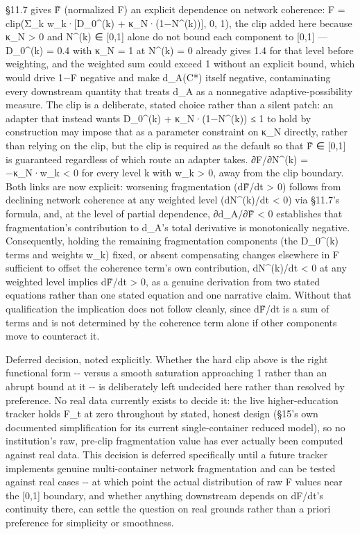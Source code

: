 \documentclass[
]{article}
\begin{document}
§11.7 gives F̃ (normalized F) an explicit dependence on network
coherence: F = clip(Σ\_k w\_k·{[}D\_0\^{}(k) + κ\_N·(1−N\^{}(k)){]}, 0,
1), the clip added here because κ\_N \textgreater{} 0 and N\^{}(k) ∈
{[}0,1{]} alone do not bound each component to {[}0,1{]} --- D\_0\^{}(k)
= 0.4 with κ\_N = 1 at N\^{}(k) = 0 already gives 1.4 for that level
before weighting, and the weighted sum could exceed 1 without an
explicit bound, which would drive 1−F negative and make d\_A(C*) itself
negative, contaminating every downstream quantity that treats d\_A as a
nonnegative adaptive-possibility measure. The clip is a deliberate,
stated choice rather than a silent patch: an adapter that instead wants
D\_0\^{}(k) + κ\_N·(1−N\^{}(k)) ≤ 1 to hold by construction may impose
that as a parameter constraint on κ\_N directly, rather than relying on
the clip, but the clip is required as the default so that F̃ ∈ {[}0,1{]}
is guaranteed regardless of which route an adapter takes. ∂F/∂N\^{}(k) =
−κ\_N·w\_k \textless{} 0 for every level k with w\_k \textgreater{} 0,
away from the clip boundary. Both links are now explicit: worsening
fragmentation (dF̃/dt \textgreater{} 0) follows from declining network
coherence at any weighted level (dN\^{}(k)/dt \textless{} 0) via §11.7's
formula, and, at the level of partial dependence, ∂d\_A/∂F̃ \textless{} 0
establishes that fragmentation's contribution to d\_A's total derivative
is monotonically negative. Consequently, holding the remaining
fragmentation components (the D\_0\^{}(k) terms and weights w\_k) fixed,
or absent compensating changes elsewhere in F sufficient to offset the
coherence term's own contribution, dN\^{}(k)/dt \textless{} 0 at any
weighted level implies dF̃/dt \textgreater{} 0, as a genuine derivation
from two stated equations rather than one stated equation and one
narrative claim. Without that qualification the implication does not
follow cleanly, since dF̃/dt is a sum of terms and is not determined by
the coherence term alone if other components move to counteract it.

Deferred decision, noted explicitly. Whether the hard clip above is the
right functional form -\/- versus a smooth saturation approaching 1
rather than an abrupt bound at it -\/- is deliberately left undecided
here rather than resolved by preference. No real data currently exists
to decide it: the live higher-education tracker holds F\_t at zero
throughout by stated, honest design (§15's own documented simplification
for its current single-container reduced model), so no institution's
raw, pre-clip fragmentation value has ever actually been computed
against real data. This decision is deferred specifically until a future
tracker implements genuine multi-container network fragmentation and can
be tested against real cases -\/- at which point the actual distribution
of raw F values near the {[}0,1{]} boundary, and whether anything
downstream depends on dF/dt's continuity there, can settle the question
on real grounds rather than a priori preference for simplicity or
smoothness.
\end{document}

